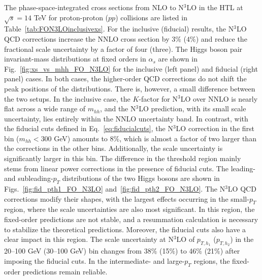 The phase-space-integrated cross sections from NLO to N$^3$LO in the HTL at $\sqrt{s}=14$ TeV for proton-proton ($pp$) collisions are listed in Table~\ref{tab:FON3LOinclusivexs}. For the inclusive (fiducial) results, the N$^3$LO QCD corrections increase the NNLO cross section by $3\%$ ($4\%$) and reduce the fractional scale uncertainty by a factor of four (three).
The Higgs boson pair invariant-mass distributions at fixed orders in $\alpha_s$ are shown in Fig.~\ref{fig:xs_vs_mhh_FO_N3LO} for the inclusive (left panel) and fiducial (right panel) cases. In both cases, the higher-order QCD corrections do not shift the peak positions of the distributions. There is, however, a small difference between the two setups. In the inclusive case, the $K$-factor for N$^3$LO over NNLO is nearly flat across a wide range of $m_{hh}$, and the N$^3$LO prediction, with its small scale uncertainty, lies entirely within the NNLO uncertainty band. In contrast, with the fiducial cuts defined in Eq.~\eqref{eq:fiducialcuts}, the N$^3$LO correction in the first bin ($m_{hh}<300$ GeV) amounts to 8$\%$, which is almost a factor of two larger than the corrections in the other bins. Additionally, the scale uncertainty is significantly larger in this bin. The difference in the threshold region mainly stems from linear power corrections in the presence of fiducial cuts. The leading- and subleading-$p_T$ distributions of the two Higgs bosons are shown in Figs.~\ref{fig:fid_pth1_FO_N3LO} and~\ref{fig:fid_pth2_FO_N3LO}. The N$^3$LO QCD corrections modify their shapes, with the largest effects occurring in the small-$p_T$ region, where the scale uncertainties are also most significant. In this region, the fixed-order predictions are not stable, and a resummation calculation is necessary to stabilize the theoretical predictions. Moreover, the fiducial cuts also have a clear impact in this region. The scale uncertainty at N$^3$LO of $p_{T,h_1}$ ($p_{T,h_2}$) in the 20--100 GeV (30--100 GeV) bin changes from 38$\%$ (15$\%$) to 46$\%$ (21$\%$) after imposing the fiducial cuts.
In the intermediate- and large-$p_T$ regions, the fixed-order predictions remain reliable.
